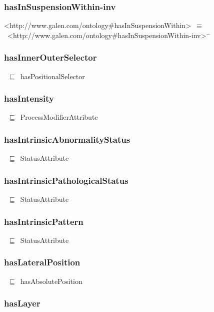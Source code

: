 \documentclass{article}
\begin{document}
\subsubsection*{hasInSuspensionWithin-inv}

<http://www.galen.com/ontology#hasInSuspensionWithin>~\ensuremath{\equiv}~<http://www.galen.com/ontology#hasInSuspensionWithin-inv>\ensuremath{^-}

\subsubsection*{hasInnerOuterSelector}

~\ensuremath{\sqsubseteq}~hasPositionalSelector

\subsubsection*{hasIntensity}

~\ensuremath{\sqsubseteq}~ProcessModifierAttribute

\subsubsection*{hasIntrinsicAbnormalityStatus}

~\ensuremath{\sqsubseteq}~StatusAttribute

\subsubsection*{hasIntrinsicPathologicalStatus}

~\ensuremath{\sqsubseteq}~StatusAttribute

\subsubsection*{hasIntrinsicPattern}

~\ensuremath{\sqsubseteq}~StatusAttribute

\subsubsection*{hasLateralPosition}

~\ensuremath{\sqsubseteq}~hasAbsolutePosition

\subsubsection*{hasLayer}
\end{document}

